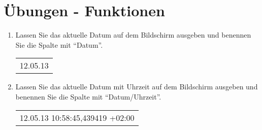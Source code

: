 \clearpage
    \section{\"Ubungen - Funktionen}
      \begin{enumerate}
        \item Lassen Sie das aktuelle Datum auf dem Bildschirm ausgeben und
        benennen Sie die Spalte mit \enquote{Datum}.
        \begin{center}
          \begin{small}
            \tablehead{}
            \begin{msoraclesql}
              \begin{supertabular}{l}
                12.05.13 \\
              \end{supertabular}
            \end{msoraclesql}
          \end{small}
        \end{center}
        \item Lassen Sie das aktuelle Datum mit Uhrzeit auf dem Bildschirm
        ausgeben und benennen Sie die Spalte mit \enquote{Datum/Uhrzeit}.
        \begin{center}
          \begin{small}
            \tablehead{}
            \begin{msoraclesql}
              \begin{supertabular}{l}
                12.05.13 10:58:45,439419 +02:00 \\

\end{supertabular}
\end{msoraclesql}
\end{small}
\end{center}
\end{enumerate}
